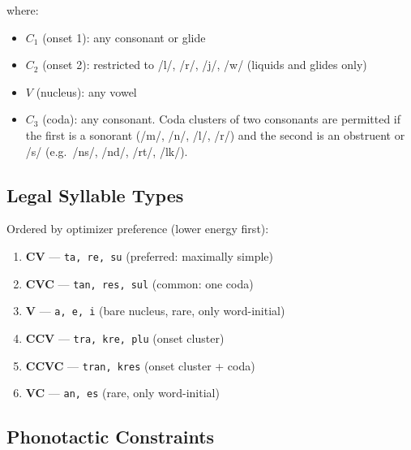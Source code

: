 \documentclass[12pt]{book}
\begin{document}
\noindent where:
\begin{itemize}
  \item $C_1$ (onset 1): any consonant or glide
  \item $C_2$ (onset 2): restricted to /l/, /r/, /j/, /w/ (liquids and glides only)
  \item $V$ (nucleus): any vowel
  \item $C_3$ (coda): any consonant. Coda clusters of two consonants are
        permitted if the first is a sonorant (/m/, /n/, /l/, /r/) and the
        second is an obstruent or /s/ (e.g.\ /ns/, /nd/, /rt/, /lk/).
\end{itemize}

\subsection{Legal Syllable Types}

Ordered by optimizer preference (lower energy first):

\begin{enumerate}
  \item \textbf{CV} --- \texttt{ta, re, su} (preferred: maximally simple)
  \item \textbf{CVC} --- \texttt{tan, res, sul} (common: one coda)
  \item \textbf{V} --- \texttt{a, e, i} (bare nucleus, rare, only word-initial)
  \item \textbf{CCV} --- \texttt{tra, kre, plu} (onset cluster)
  \item \textbf{CCVC} --- \texttt{tran, kres} (onset cluster + coda)
  \item \textbf{VC} --- \texttt{an, es} (rare, only word-initial)
\end{enumerate}

\subsection{Phonotactic Constraints}
\end{document}
